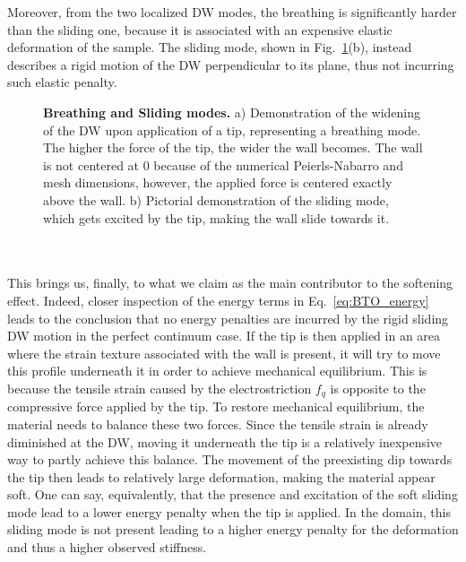 Moreover, from the two localized DW modes, the breathing is significantly harder than the sliding one, because it is associated with an expensive elastic deformation of the sample.
The sliding mode, shown in Fig.~\ref{fig:BTO_breathing_sliding}(b), instead describes a rigid motion of the DW perpendicular to its plane, thus not incurring such elastic penalty. 
\begin{figure}
	\caption{\label{fig:BTO_breathing_sliding}{\bf Breathing and Sliding modes.} a) Demonstration of the widening of the DW upon application of a tip, representing a breathing mode. The higher the force of the tip, the wider the wall becomes. The wall is not centered at 0 because of the numerical Peierls-Nabarro and mesh dimensions, however, the applied force is centered exactly above the wall. b) Pictorial demonstration of the sliding mode, which gets excited by the tip, making the wall slide towards it.}
\end{figure}
\\\\
This brings us, finally, to what we claim as the main contributor to the softening effect.
Indeed, closer inspection of the energy terms in Eq.~\eqref{eq:BTO_energy} leads to the conclusion that no energy penalties are incurred by the rigid sliding DW motion in the perfect continuum case.
If the tip is then applied in an area where the strain texture associated with the wall is present, it will try to move this profile underneath it in order to achieve mechanical equilibrium.
This is because the tensile strain caused by the electrostriction $f_q$ is opposite to the compressive force applied by the tip.
To restore mechanical equilibrium, the material needs to balance these two forces.
Since the tensile strain is already diminished at the DW, moving it underneath the tip is a relatively inexpensive way to partly achieve this balance.
The movement of the preexisting dip towards the tip then leads to relatively large deformation, making the material appear soft.
One can say, equivalently, that the presence and excitation of the soft sliding mode lead to a lower energy penalty when the tip is applied.
In the domain, this sliding mode is not present leading to a higher energy penalty for the deformation and thus a higher observed stiffness.

